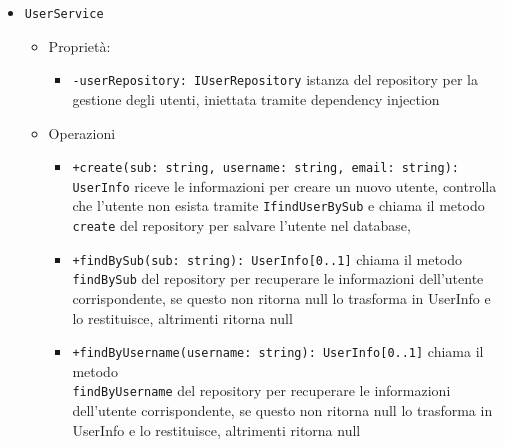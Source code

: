 \documentclass[a4paper, 11pt]{article}
\begin{document}
\begin{itemize}
\begin{itemize}
			

			\item \texttt{UserService}
				\begin{itemize}
					\item Proprietà:
						\begin{itemize}
							\item \texttt{-userRepository: IUserRepository} istanza del repository per la gestione degli utenti, iniettata tramite dependency injection
						\end{itemize}
					\item Operazioni
						\begin{itemize}
							\item \texttt{+create(sub: string, username: string, email: string): UserInfo} riceve le informazioni per creare un nuovo utente, controlla che l'utente non esista tramite \texttt{IfindUserBySub} e chiama il metodo \texttt{create} del repository per salvare l'utente nel database,
							\item \texttt{+findBySub(sub: string): UserInfo[0..1]} chiama il metodo \texttt{findBySub} del repository per recuperare le informazioni dell'utente corrispondente, se questo non ritorna null lo trasforma in UserInfo e lo restituisce, altrimenti ritorna null
							\item \texttt{+findByUsername(username: string): UserInfo[0..1]} chiama il metodo \\ \texttt{findByUsername} del repository per recuperare le informazioni dell'utente corrispondente, se questo non ritorna null lo trasforma in UserInfo e lo restituisce, altrimenti ritorna null
						\end{itemize}
				\end{itemize}


\end{itemize}
\end{itemize}
\end{document}
